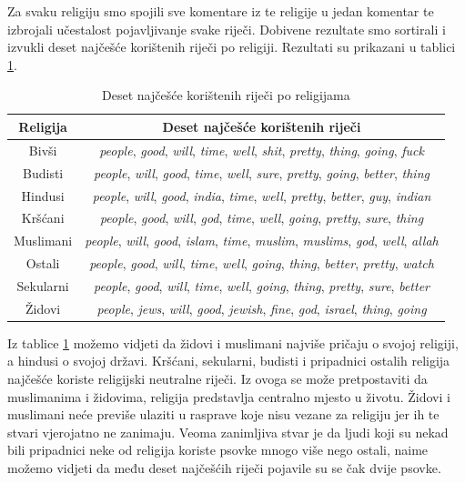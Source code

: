 \documentclass[times,utf8,zavrsni]{fer}
\begin{document}
Za svaku religiju smo spojili sve komentare iz te religije u jedan komentar te izbrojali učestalost pojavljivanje svake riječi. Dobivene rezultate smo sortirali i izvukli deset najčešće korištenih riječi po religiji. Rezultati su prikazani u tablici \ref{table:voc}. \\


\begin{table}[h!]
\centering
\caption{Deset najčešće korištenih riječi po religijama}
\label{table:voc}
\begin{tabular}{@{}cc@{}}
\hline
Religija  & Deset najčešće korištenih riječi                                       \\
\hline
\hline
Bivši     & \emph{people}, \emph{good}, \emph{will}, \emph{time}, \emph{well}, \emph{shit}, \emph{pretty}, \emph{thing}, \emph{going}, \emph{fuck}    \\
Budisti   & \emph{people}, \emph{will}, \emph{good}, \emph{time}, \emph{well}, \emph{sure}, \emph{pretty}, \emph{going}, \emph{better}, \emph{thing}  \\
Hindusi   & \emph{people}, \emph{will}, \emph{good}, \emph{india}, \emph{time}, \emph{well}, \emph{pretty}, \emph{better}, \emph{guy}, \emph{indian} \\
Kršćani   & \emph{people}, \emph{good}, \emph{will}, \emph{god}, \emph{time}, \emph{well}, \emph{going}, \emph{pretty}, \emph{sure}, \emph{thing}     \\
Muslimani & \emph{people}, \emph{will}, \emph{good}, \emph{islam}, \emph{time}, \emph{muslim}, \emph{muslims}, \emph{god}, \emph{well}, \emph{allah}  \\
Ostali    & \emph{people}, \emph{good}, \emph{will}, \emph{time}, \emph{well}, \emph{going}, \emph{thing}, \emph{better}, \emph{pretty}, \emph{watch} \\
Sekularni & \emph{people}, \emph{good}, \emph{will}, \emph{time}, \emph{well}, \emph{going}, \emph{thing}, \emph{pretty}, \emph{sure}, \emph{better}  \\
Židovi    & \emph{people}, \emph{jews}, \emph{will}, \emph{good}, \emph{jewish}, \emph{fine}, \emph{god}, \emph{israel}, \emph{thing}, \emph{going}   \\

\hline
\end{tabular}
\end{table}


Iz tablice \ref{table:voc} možemo vidjeti da židovi i muslimani najviše pričaju o svojoj religiji, a hindusi o svojoj državi. Kršćani, sekularni, budisti i pripadnici ostalih religija najčešće koriste religijski neutralne riječi. Iz ovoga se može pretpostaviti da muslimanima i židovima, religija predstavlja centralno mjesto u životu. Židovi i muslimani neće previše ulaziti u rasprave koje nisu vezane za religiju jer ih te stvari vjerojatno ne zanimaju. Veoma zanimljiva stvar je da ljudi koji su nekad bili pripadnici neke od religija koriste psovke mnogo više nego ostali, naime možemo vidjeti da među deset najčešćih riječi pojavile su se čak dvije psovke.
\end{document}
